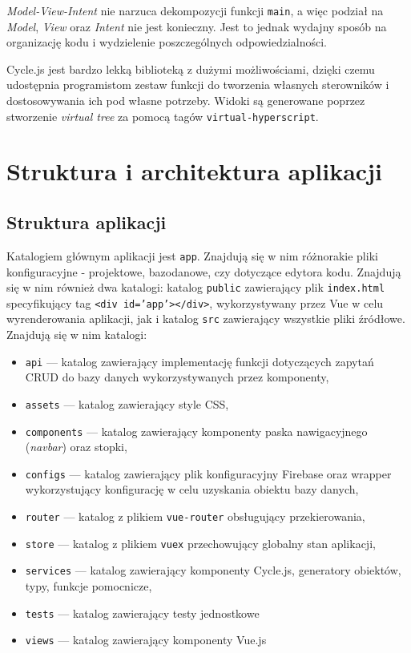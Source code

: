 \documentclass[shortabstract]{iithesis}
\theoremstyle{definition} \newtheorem{definition}{Definicja}[]
\theoremstyle{remark} \newtheorem{remark}[definition]{Observation}
\theoremstyle{plain} \newtheorem{theorem}[definition]{Theorem}
\theoremstyle{plain} \newtheorem{lemma}[definition]{Lemma}
\begin{document}
\textit{Model-View-Intent} nie narzuca dekompozycji funkcji \texttt{main}, a więc podział na \textit{Model}, \textit{View} oraz \textit{Intent} nie jest konieczny. Jest to jednak wydajny sposób na organizację kodu i wydzielenie poszczególnych odpowiedzialności.

Cycle.js jest bardzo lekką biblioteką z dużymi możliwościami, dzięki czemu udostępnia programistom zestaw funkcji do tworzenia własnych sterowników i dostosowywania ich pod własne potrzeby. Widoki są generowane poprzez stworzenie \textit{virtual tree} za pomocą tagów \texttt{virtual-hyperscript}.


\chapter{Struktura i architektura aplikacji}
\section{Struktura aplikacji}
Katalogiem głównym aplikacji jest \texttt{app}. Znajdują się w nim różnorakie pliki konfiguracyjne - projektowe, bazodanowe, czy dotyczące edytora kodu. Znajdują się w nim również dwa katalogi: katalog \texttt{public} zawierający plik \texttt{index.html} specyfikujący tag \texttt{<div id='app'></div>}, wykorzystywany przez Vue w celu wyrenderowania aplikacji, jak i katalog \texttt{src} zawierający wszystkie pliki źródłowe. Znajdują się w nim katalogi:
\begin{itemize}
    \item \texttt{api} --- katalog zawierający implementację funkcji dotyczących zapytań CRUD do bazy danych wykorzystywanych przez komponenty,
    \item \texttt{assets} --- katalog zawierający style CSS,
    \item \texttt{components} --- katalog zawierający komponenty paska nawigacyjnego (\textit{navbar}) oraz stopki,
    \item \texttt{configs} --- katalog zawierający plik konfiguracyjny Firebase oraz wrapper wykorzystujący konfigurację w celu uzyskania obiektu bazy danych,
    \item \texttt{router} --- katalog z plikiem \texttt{vue-router} obsługujący przekierowania,
    \item \texttt{store} --- katalog z plikiem \texttt{vuex} przechowujący globalny stan aplikacji,
    \item \texttt{services} --- katalog zawierający komponenty Cycle.js, generatory obiektów, typy, funkcje pomocnicze,
    \item \texttt{tests} --- katalog zawierający testy jednostkowe
    \item \texttt{views} --- katalog zawierający komponenty Vue.js
\end{itemize}
\end{document}
